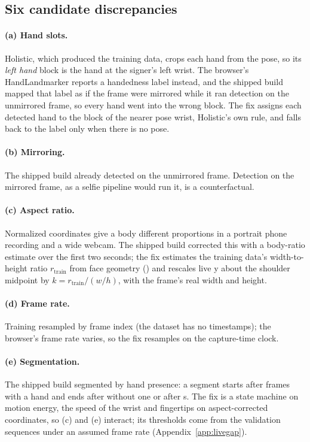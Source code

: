 \subsection{Six candidate discrepancies}
\label{sec:faults}

\paragraph{(a) Hand slots.} Holistic, which produced the training data, crops each hand from the
pose, so its \emph{left hand} block is the hand at the signer's left wrist. The browser's
HandLandmarker reports a handedness label instead, and the shipped build mapped that label as if
the frame were mirrored while it ran detection on the unmirrored frame, so every hand went into the
wrong block. The fix assigns each detected hand to the block of the nearer pose wrist, Holistic's
own rule, and falls back to the label only when there is no pose.

\paragraph{(b) Mirroring.} The shipped build already detected on the unmirrored frame. Detection
on the mirrored frame, as a selfie pipeline would run it, is a counterfactual.

\paragraph{(c) Aspect ratio.} Normalized coordinates give a body different proportions in a
portrait phone recording and a wide webcam. The shipped build corrected this with a body-ratio
estimate over the first two seconds; the fix estimates the training data's width-to-height ratio
$r_{\mathrm{train}}$ from face geometry () and rescales live y about the shoulder midpoint by
$k = r_{\mathrm{train}} / (w/h)$, with the frame's real width and height.

\paragraph{(d) Frame rate.} Training resampled by frame index (the dataset has no timestamps);
the browser's frame rate varies, so the fix resamples on the capture-time clock.

\paragraph{(e) Segmentation.} The shipped build segmented by hand presence: a segment starts after
 frames with a hand and ends after  without one or after  s.
The fix is a state machine on motion energy, the speed of the wrist and fingertips on
aspect-corrected coordinates, so (c) and (e) interact; its thresholds come from the validation
sequences under an assumed frame rate (Appendix~\ref{app:livegap}).

